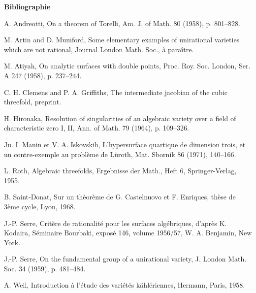 \documentclass[10pt]{article}
\begin{document}
\begin{center}\bfseries Bibliographie\end{center}
\begin{enumerate}[label={[\arabic*]}]
\item A. Andreotti, On a theorem of Torelli, Am. J. of Math. 80 (1958), p. 801--828.
\item M. Artin and D. Mumford, Some elementary examples of unirational varieties which are not rational, Journal London Math. Soc., à paraître.
\item M. Atiyah, On analytic surfaces with double points, Proc. Roy. Soc. London, Ser. A 247 (1958), p. 237--244.
\item C. H. Clemens and P. A. Griffiths, The intermediate jacobian of the cubic threefold, preprint.
\item H. Hironaka, Resolution of singularities of an algebraic variety over a field of characteristic zero I, II, Ann. of Math. 79 (1964), p. 109--326.
\item Ju. I. Manin et V. A. Iskovskih, L'hypersurface quartique de dimension trois, et un contre-exemple au problème de Lüroth, Mat. Sbornik 86 (1971), 140--166.
\item L. Roth, Algebraic threefolds, Ergebnisse der Math., Heft 6, Springer-Verlag, 1955.
\item B. Saint-Donat, Sur un théorème de G. Castelnuovo et F. Enriques, thèse de 3ème cycle, Lyon, 1968.
\item J.-P. Serre, Critère de rationalité pour les surfaces algébriques, d'après K. Kodaira, Séminaire Bourbaki, exposé 146, volume 1956/57, W. A. Benjamin, New York.
\item J.-P. Serre, On the fundamental group of a unirational variety, J. London Math. Soc. 34 (1959), p. 481--484.
\item A. Weil, Introduction à l'étude des variétés kählériennes, Hermann, Paris, 1958.
\end{enumerate}
\end{document}
